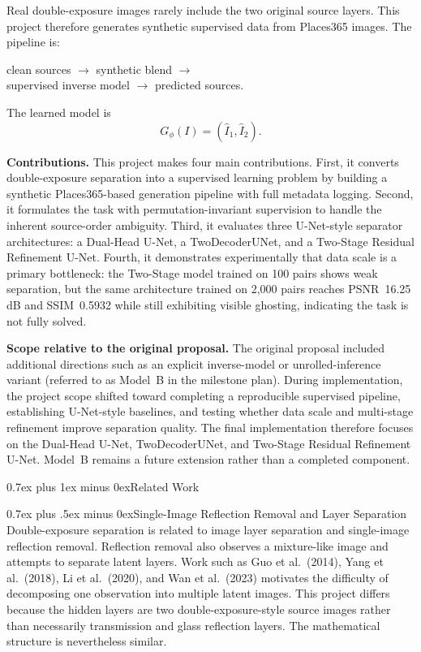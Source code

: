 \documentclass[conference]{IEEEtran}
\makeatletter
\def\section{\@startsection{section}{1}{\z@}{1.5ex plus 1.5ex minus 0.5ex}%
  {0.7ex plus 1ex minus 0ex}{\normalfont\normalsize\centering\scshape\bfseries}}
\def\subsection{\@startsection{subsection}{2}{\z@}{1.5ex plus 1.5ex minus 0.5ex}%
  {0.7ex plus .5ex minus 0ex}{\normalfont\normalsize\bfseries}}
\makeatother
\begin{document}
Real double-exposure images rarely include the two original source layers. This project therefore generates synthetic supervised data from Places365 images. The pipeline is:
\begin{center}
clean sources $\rightarrow$ synthetic blend $\rightarrow$ \\ supervised inverse model $\rightarrow$ predicted sources.
\end{center}
The learned model is
\[
G_\phi(I)=(\hat I_1,\hat I_2).
\]

\textbf{Contributions.} This project makes four main contributions. First, it converts double-exposure separation into a supervised learning problem by building a synthetic Places365-based generation pipeline with full metadata logging. Second, it formulates the task with permutation-invariant supervision to handle the inherent source-order ambiguity. Third, it evaluates three U-Net-style separator architectures: a Dual-Head U-Net, a TwoDecoderUNet, and a Two-Stage Residual Refinement U-Net. Fourth, it demonstrates experimentally that data scale is a primary bottleneck: the Two-Stage model trained on 100 pairs shows weak separation, but the same architecture trained on 2,000 pairs reaches PSNR~16.25\,dB and SSIM~0.5932 while still exhibiting visible ghosting, indicating the task is not fully solved.

\textbf{Scope relative to the original proposal.}
The original proposal included additional directions such as an explicit inverse-model or unrolled-inference variant (referred to as Model~B in the milestone plan). During implementation, the project scope shifted toward completing a reproducible supervised pipeline, establishing U-Net-style baselines, and testing whether data scale and multi-stage refinement improve separation quality. The final implementation therefore focuses on the Dual-Head U-Net, TwoDecoderUNet, and Two-Stage Residual Refinement U-Net. Model~B remains a future extension rather than a completed component.

\section{Related Work}

\subsection{Single-Image Reflection Removal and Layer Separation}
Double-exposure separation is related to image layer separation and single-image reflection removal. Reflection removal also observes a mixture-like image and attempts to separate latent layers. Work such as Guo et al.\ (2014), Yang et al.\ (2018), Li et al.\ (2020), and Wan et al.\ (2023) motivates the difficulty of decomposing one observation into multiple latent images. This project differs because the hidden layers are two double-exposure-style source images rather than necessarily transmission and glass reflection layers. The mathematical structure is nevertheless similar.
\end{document}

